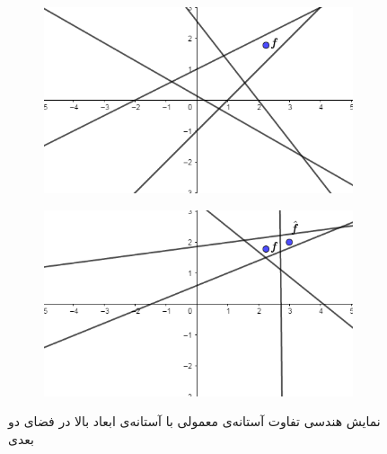 \begin{figure}
	\centering
	\begin{subfigure}{0.4\textwidth} %
		\centering
		\includegraphics[scale=0.3]{Images/ch3/fig16}
		\caption{} %
		\label{fig16}
	\end{subfigure}
	\vspace{1em} %
	\begin{subfigure}{0.4\textwidth} %
		\centering
		\includegraphics[scale=0.3]{Images/ch3/fig17}
		\caption{} %
		\label{fig17}
	\end{subfigure}
	\caption{نمایش هندسی تفاوت آستانه‌ی معمولی با آستانه‌ی ابعاد بالا در فضای دو بعدی}
\end{figure}


